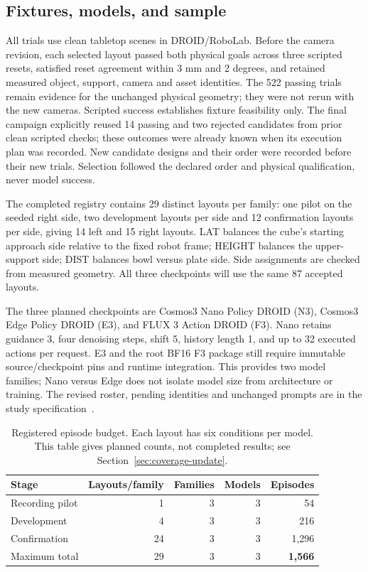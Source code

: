 \documentclass[11pt]{article}
\begin{document}
\subsection{Fixtures, models, and sample}
All trials use clean tabletop scenes in DROID/RoboLab. Before the camera revision, each selected layout passed both physical goals across three scripted resets, satisfied reset agreement within 3 mm and 2 degrees, and retained measured object, support, camera and asset identities. The 522 passing trials remain evidence for the unchanged physical geometry; they were not rerun with the new cameras. Scripted success establishes fixture feasibility only. The final campaign explicitly reused 14 passing and two rejected candidates from prior clean scripted checks; these outcomes were already known when its execution plan was recorded. New candidate designs and their order were recorded before their new trials. Selection followed the declared order and physical qualification, never model success.

The completed registry contains 29 distinct layouts per family: one pilot on the seeded right side, two development layouts per side and 12 confirmation layouts per side, giving 14 left and 15 right layouts. LAT balances the cube's starting approach side relative to the fixed robot frame; HEIGHT balances the upper-support side; DIST balances bowl versus plate side. Side assignments are checked from measured geometry. All three checkpoints will use the same 87 accepted layouts.

The three planned checkpoints are Cosmos3 Nano Policy DROID (N3), Cosmos3 Edge Policy DROID (E3), and FLUX 3 Action DROID (F3). Nano retains guidance 3, four denoising steps, shift 5, history length 1, and up to 32 executed actions per request. E3 and the root BF16 F3 package still require immutable source/checkpoint pins and runtime integration. This provides two model families; Nano versus Edge does not isolate model size from architecture or training. The revised roster, pending identities and unchanged prompts are in the study specification~\cite{study}.

\begin{table}[ht]
\centering
\caption{Registered episode budget. Each layout has six conditions per model. This table gives planned counts, not completed results; see Section~\ref{sec:coverage-update}.}
\label{tab:matrix}
\begin{tabular}{@{}lrrrr@{}}
\toprule
Stage & Layouts/family & Families & Models & Episodes \\
\midrule
Recording pilot & 1 & 3 & 3 & 54 \\
Development & 4 & 3 & 3 & 216 \\
Confirmation & 24 & 3 & 3 & 1,296 \\
\midrule
Maximum total & 29 & 3 & 3 & \textbf{1,566} \\
\bottomrule
\end{tabular}
\end{table}
\end{document}
